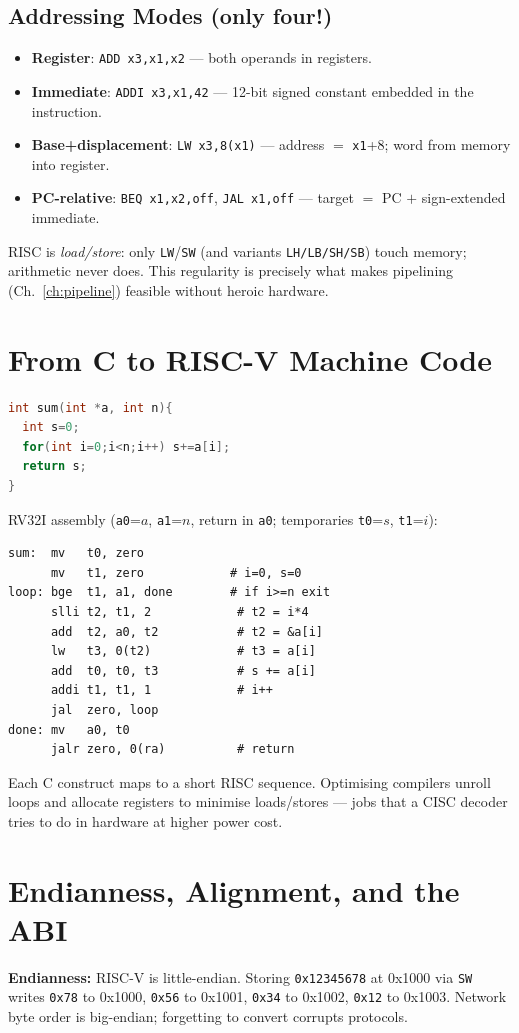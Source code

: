 \subsection{Addressing Modes (only four!)}
\begin{itemize}
\item \textbf{Register}: \texttt{ADD x3,x1,x2} --- both operands in registers.
\item \textbf{Immediate}: \texttt{ADDI x3,x1,42} --- 12-bit signed constant embedded in the instruction.
\item \textbf{Base+displacement}: \texttt{LW x3,8(x1)} --- address $=$ \texttt{x1}+8; word from memory into register.
\item \textbf{PC-relative}: \texttt{BEQ x1,x2,off}, \texttt{JAL x1,off} --- target $=$ PC $+$ sign-extended immediate.
\end{itemize}
RISC is \emph{load/store}: only \texttt{LW}/\texttt{SW} (and variants \texttt{LH/LB/SH/SB}) touch memory; arithmetic never does.
This regularity is precisely what makes pipelining (Ch.~\ref{ch:pipeline}) feasible without heroic hardware.

\section{From C to RISC-V Machine Code}
\begin{lstlisting}[language=C]
int sum(int *a, int n){
  int s=0;
  for(int i=0;i<n;i++) s+=a[i];
  return s;
}
\end{lstlisting}
RV32I assembly (\texttt{a0}=$a$, \texttt{a1}=$n$, return in \texttt{a0}; temporaries \texttt{t0}=$s$, \texttt{t1}=$i$):
\begin{lstlisting}[language={[x86masm]Assembler}]
sum:  mv   t0, zero
      mv   t1, zero            # i=0, s=0
loop: bge  t1, a1, done        # if i>=n exit
      slli t2, t1, 2            # t2 = i*4
      add  t2, a0, t2           # t2 = &a[i]
      lw   t3, 0(t2)            # t3 = a[i]
      add  t0, t0, t3           # s += a[i]
      addi t1, t1, 1            # i++
      jal  zero, loop
done: mv   a0, t0
      jalr zero, 0(ra)          # return
\end{lstlisting}
Each C construct maps to a short RISC sequence. Optimising compilers unroll loops and allocate registers to
minimise loads/stores --- jobs that a CISC decoder tries to do in hardware at higher power cost.

\section{Endianness, Alignment, and the ABI}
\textbf{Endianness:} RISC-V is little-endian. Storing \texttt{0x12345678} at 0x1000 via \texttt{SW} writes
\texttt{0x78} to 0x1000, \texttt{0x56} to 0x1001, \texttt{0x34} to 0x1002, \texttt{0x12} to 0x1003.
Network byte order is big-endian; forgetting to convert corrupts protocols.

